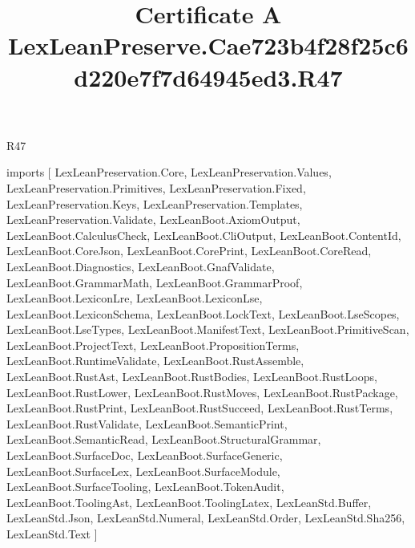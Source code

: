 \begin{lexlean}{R47}
\title{Certificate A LexLeanPreserve.Cae723b4f28f25c6d220e7f7d64945ed3.R47}
\begin{coremodule}
imports [
  LexLeanPreservation.Core,
  LexLeanPreservation.Values,
  LexLeanPreservation.Primitives,
  LexLeanPreservation.Fixed,
  LexLeanPreservation.Keys,
  LexLeanPreservation.Templates,
  LexLeanPreservation.Validate,
  LexLeanBoot.AxiomOutput,
  LexLeanBoot.CalculusCheck,
  LexLeanBoot.CliOutput,
  LexLeanBoot.ContentId,
  LexLeanBoot.CoreJson,
  LexLeanBoot.CorePrint,
  LexLeanBoot.CoreRead,
  LexLeanBoot.Diagnostics,
  LexLeanBoot.GnafValidate,
  LexLeanBoot.GrammarMath,
  LexLeanBoot.GrammarProof,
  LexLeanBoot.LexiconLre,
  LexLeanBoot.LexiconLse,
  LexLeanBoot.LexiconSchema,
  LexLeanBoot.LockText,
  LexLeanBoot.LseScopes,
  LexLeanBoot.LseTypes,
  LexLeanBoot.ManifestText,
  LexLeanBoot.PrimitiveScan,
  LexLeanBoot.ProjectText,
  LexLeanBoot.PropositionTerms,
  LexLeanBoot.RuntimeValidate,
  LexLeanBoot.RustAssemble,
  LexLeanBoot.RustAst,
  LexLeanBoot.RustBodies,
  LexLeanBoot.RustLoops,
  LexLeanBoot.RustLower,
  LexLeanBoot.RustMoves,
  LexLeanBoot.RustPackage,
  LexLeanBoot.RustPrint,
  LexLeanBoot.RustSucceed,
  LexLeanBoot.RustTerms,
  LexLeanBoot.RustValidate,
  LexLeanBoot.SemanticPrint,
  LexLeanBoot.SemanticRead,
  LexLeanBoot.StructuralGrammar,
  LexLeanBoot.SurfaceDoc,
  LexLeanBoot.SurfaceGeneric,
  LexLeanBoot.SurfaceLex,
  LexLeanBoot.SurfaceModule,
  LexLeanBoot.SurfaceTooling,
  LexLeanBoot.TokenAudit,
  LexLeanBoot.ToolingAst,
  LexLeanBoot.ToolingLatex,
  LexLeanStd.Buffer,
  LexLeanStd.Json,
  LexLeanStd.Numeral,
  LexLeanStd.Order,
  LexLeanStd.Sha256,
  LexLeanStd.Text
]


\end{coremodule}
\end{lexlean}
